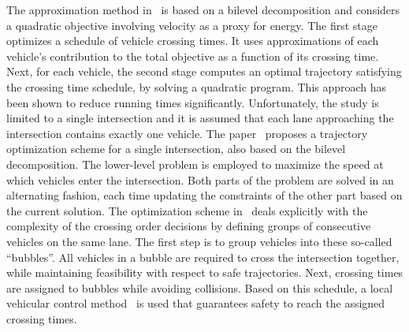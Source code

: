 \documentclass{article}
\theoremstyle{definition}
\theoremstyle{plain}
\begin{document}
The approximation method in~\cite{hultApproximateSolutionOptimal2015} is based
on a bilevel decomposition and considers a quadratic objective involving
velocity as a proxy for energy. The first stage optimizes a schedule of vehicle
crossing times. It uses approximations of each vehicle's contribution to the
total objective as a function of its crossing time. Next, for each vehicle, the
second stage computes an optimal trajectory satisfying the crossing time
schedule, by solving a quadratic program. This approach has been shown to reduce
running times significantly. Unfortunately, the study is limited to a single
intersection and it is assumed that each lane approaching the intersection
contains exactly one vehicle.
The paper~\cite{zhaoBilevelProgrammingModel2021} proposes a trajectory
optimization scheme for a single intersection, also based on the bilevel
decomposition. The lower-level problem is employed to maximize the speed at
which vehicles enter the intersection. Both parts of the problem are solved in an alternating
fashion, each time updating the constraints of the other part based on the
current solution.
The optimization scheme
in~\cite{tallapragadaHierarchicaldistributedOptimizedCoordination2017} deals
explicitly with the complexity of the crossing order decisions by defining
groups of consecutive vehicles on the same lane. The first step is to group
vehicles into these so-called ``bubbles''. All vehicles in a bubble are required
to cross the intersection together, while maintaining feasibility with respect
to safe trajectories. Next, crossing times are assigned to bubbles while
avoiding collisions. Based on this schedule, a local vehicular control
method~\cite{tallapragadaDistributedControlVehicle2017} is used that guarantees
safety to reach the assigned crossing times.



\end{document}
